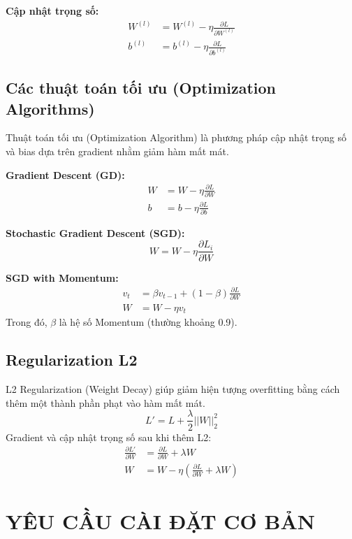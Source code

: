 \documentclass[12pt,a4paper]{report}
\begin{document}
\textbf{Cập nhật trọng số:}
\begin{align}
    W^{(l)} &= W^{(l)} - \eta \frac{\partial L}{\partial W^{(l)}} \\
    b^{(l)} &= b^{(l)} - \eta \frac{\partial L}{\partial b^{(l)}}
\end{align}

\section{Các thuật toán tối ưu (Optimization Algorithms)}
Thuật toán tối ưu (Optimization Algorithm) là phương pháp cập nhật trọng số và bias dựa trên gradient nhằm giảm hàm mất mát.

\textbf{Gradient Descent (GD):}
\begin{align}
    W &= W - \eta \frac{\partial L}{\partial W} \\
    b &= b - \eta \frac{\partial L}{\partial b}
\end{align}

\textbf{Stochastic Gradient Descent (SGD):}
\begin{equation}
    W = W - \eta \frac{\partial L_i}{\partial W}
\end{equation}

\textbf{SGD with Momentum:}
\begin{align}
    v_t &= \beta v_{t-1} + (1 - \beta)\frac{\partial L}{\partial W} \\
    W &= W - \eta v_t
\end{align}
Trong đó, $\beta$ là hệ số Momentum (thường khoảng 0.9).

\section{Regularization L2}
L2 Regularization (Weight Decay) giúp giảm hiện tượng overfitting bằng cách thêm một thành phần phạt vào hàm mất mát.
\begin{equation}
    L' = L + \frac{\lambda}{2} ||W||_2^2
\end{equation}
Gradient và cập nhật trọng số sau khi thêm L2:
\begin{align}
    \frac{\partial L'}{\partial W} &= \frac{\partial L}{\partial W} + \lambda W \\
    W &= W - \eta \left( \frac{\partial L}{\partial W} + \lambda W \right)
\end{align}


\chapter{YÊU CẦU CÀI ĐẶT CƠ BẢN}
\end{document}
